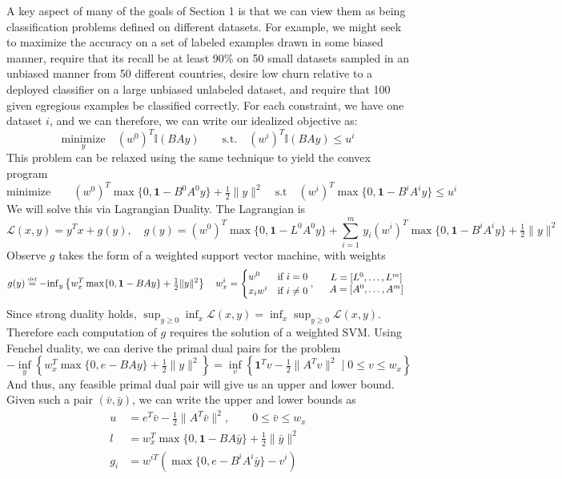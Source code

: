 \begin{example}
\noindent
A key aspect of many of the goals of Section 1 is that we can view them as
being classification  problems defined on different datasets. For example, we
might seek to maximize the accuracy on a set of labeled examples drawn in some
biased manner, require that its recall be at least 90\% on 50 small datasets
sampled in an unbiased manner from 50 different countries, desire low churn
relative to a deployed classifier on a large unbiased unlabeled dataset, and
require that 100 given egregious examples be classified correctly. For each
constraint, we have one dataset $i$, and we can therefore, we can write our
idealized objective as:
\[
\underset{y}{\mbox{minimize}}\quad (w^0)^{T}\mathbb{I}(BAy) \qquad \mbox{s.t.}\quad (w^i)^{T}\mathbb{I}(BAy) \leq u^i
\]
This problem can be relaxed using the same technique to yield the convex program
\[
 \mbox{minimize} \qquad (w^{0})^{T}\max\{0,\mathbf{1}-B^{0}A^{0}y\}+\tfrac{1}{2}\|y\|^{2} \quad \mbox{s.t} \quad (w^{i})^{T}\max\{0,\mathbf{1}-B^{i}A^{i}y\}\leq u^{i}
\]
We will solve this via Lagrangian Duality. The Lagrangian is
$$
\mathcal{L}(x,y)=y^{T}x+g(y),\quad g(y)=(w^{0})^{T}\!\max\{0,\mathbf{1}-L^{0}A^{0}y\}+{\sum_{i=1}^{m}}\,y_{i}(w^{i})^{T}\!\max\{0,\mathbf{1}-B^{i}A^{i}y\}+\tfrac{1}{2}\|y\|^{2}
$$
Observe $g$ takes the form of a weighted support vector machine, with weights
\[
g(y)\overset{\mbox{\tiny def}}{=}-\mbox{\ensuremath{\inf}}_{y}\left\{ w_{x}^{T}\max\{0,\mathbf{1}-BAy\}+\tfrac{1}{2}\|y\|^{2}\right\} \quad 
w_{x}^{i}=\begin{cases}
w^{0} & \mbox{if \ensuremath{i=0}}\\
x_{i}w^{i} & \mbox{if \ensuremath{i\neq0}}
\end{cases},\quad 
\begin{array}{c}
L=[L^{0},\dots,L^{m}]\\
A=[A^{0},\dots,A^{m}]
\end{array}
\]
Since strong duality holds, $\sup_{y\geq0}\inf_{x}\mathcal{L}(x,y)=\inf_{x}\sup_{y\geq0}\mathcal{L}(x,y)$. Therefore each computation of $g$ requires the solution of a weighted SVM.
Using Fenchel duality, we can derive the primal dual pairs for the
problem
\begin{equation}\label{eq:svm-dual-form}
-{\inf_{y}}\left\{ w_{x}^{T}\max\{0,e-BAy\}+\tfrac{1}{2}\|y\|^{2}\right\} =\inf_v\left\{ \mathbf{1}^{T}v-\tfrac{1}{2}\|A^{T}v\|^{2}\mid0\leq v\leq w_{x}\right\} 
\end{equation}
And thus, any feasible primal dual pair will give us an upper and
lower bound. Given such a pair $(\bar{v},\bar{y})$, we can write the upper and
lower bounds as
\begin{align*}
u & =e^{T}\bar{v}-\tfrac{1}{2}\|A^{T}\bar{v}\|^{2},\qquad0\leq\bar{{v}}\leq w_{x}\\
l & =w_{x}^{T}\max\{0,\mathbf{1}-BA\bar{y}\}+\tfrac{1}{2}\|\bar{y}\|^{2}\\
g_{i} & =w^{iT}(\max\{0,e-B^{i}A^{i}\bar{y}\}-v^{i})
\end{align*}

\end{example}

